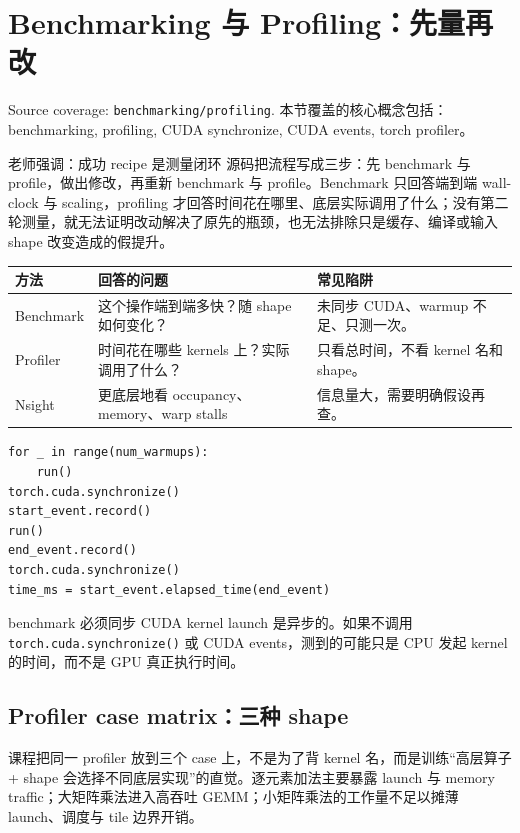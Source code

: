 \section{Benchmarking 与 Profiling：先量再改}

Source coverage: \texttt{benchmarking/profiling}. 本节覆盖的核心概念包括：benchmarking, profiling, CUDA synchronize, CUDA events, torch profiler。

\begin{knowledgebox}{老师强调：成功 recipe 是测量闭环}
源码把流程写成三步：先 benchmark 与 profile，做出修改，再重新 benchmark 与 profile。Benchmark 只回答端到端 wall-clock 与 scaling，profiling 才回答时间花在哪里、底层实际调用了什么；没有第二轮测量，就无法证明改动解决了原先的瓶颈，也无法排除只是缓存、编译或输入 shape 改变造成的假提升。
\end{knowledgebox}


\begin{longtable}{p{}p{}p{}}
\toprule\textbf{方法} & \textbf{回答的问题} & \textbf{常见陷阱} \\
\midrule
Benchmark & 这个操作端到端多快？随 shape 如何变化？ & 未同步 CUDA、warmup 不足、只测一次。 \\
Profiler & 时间花在哪些 kernels 上？实际调用了什么？ & 只看总时间，不看 kernel 名和 shape。 \\
Nsight & 更底层地看 occupancy、memory、warp stalls & 信息量大，需要明确假设再查。 \\
\bottomrule
\end{longtable}
\begin{lstlisting}[caption={CUDA event benchmark 的关键结构}]
for _ in range(num_warmups):
    run()
torch.cuda.synchronize()
start_event.record()
run()
end_event.record()
torch.cuda.synchronize()
time_ms = start_event.elapsed_time(end_event)
\end{lstlisting}
\begin{warningbox}{benchmark 必须同步}
CUDA kernel launch 是异步的。如果不调用 \texttt{torch.cuda.synchronize()} 或 CUDA events，测到的可能只是 CPU 发起 kernel 的时间，而不是 GPU 真正执行时间。
\end{warningbox}

\subsection{Profiler case matrix：三种 shape}

课程把同一 profiler 放到三个 case 上，不是为了背 kernel 名，而是训练“高层算子 + shape 会选择不同底层实现”的直觉。逐元素加法主要暴露 launch 与 memory traffic；大矩阵乘法进入高吞吐 GEMM；小矩阵乘法的工作量不足以摊薄 launch、调度与 tile 边界开销。

